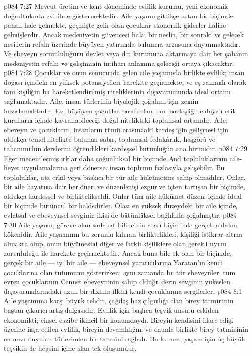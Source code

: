 \vs p084 7:27 Mevcut üretim ve kent döneminde evlilik kurumu, yeni ekonomik doğrultularda evirilme göstermektedir. Aile yaşamı gittikçe artan bir biçimde pahalı hale gelmekte, geçmişte gelir olan çocuklar ekonomik giderler haline gelmişlerdir. Ancak medeniyetin güvencesi hala; bir neslin, bir sonraki ve gelecek nesillerin refahı üzerinde büyüyen yatırımda bulunma arzusuna dayanmaktadır. Ve ebeveyn sorumluluğunu devlet veya din kurumuna aktarmaya dair her çabanın medeniyetin refahı ve gelişiminin intiharı anlamına geleceği ortaya çıkacaktır.
\vs p084 7:28 Çocuklar ve onun sonucunda gelen aile yaşamıyla birlikte evlilik; insan doğası içindeki en yüksek potansiyelleri harekete geçirmekte, ve eş zamanlı olarak fani kişiliğin bu hareketlendirilmiş niteliklerinin dışavurumunda ideal ortamı sağlamaktadır. Aile, insan türlerinin biyolojik çoğalımı için zemin hazırlamaktadır. Ev, büyüyen çocuklar tarafından kan kardeşliğine dayalı etik kuralların içinde kavranabileceği doğal nitelikteki toplumsal ortamdır. Aile; ebeveyn ve çocukların, insanların tümü arasındaki kardeşliğin gelişmesi için oldukça temel nitelikte bulunan sabır, toplumsal fedakârlık, hoşgörü ve tahammülün derslerini öğrendikleri kardeşsel bütünlüğün ana birimidir.
\vs p084 7:29 Eğer medenileşmiş ırklar daha çoğunluksal bir biçimde And topluluklarının aile\hyp{}heyet uygulamalarına geri dönerse, insan toplumu fazlasıyla gelişebilir. Bu topluluklar, ata\hyp{}erkil veya baskıcı bir tür aile hükümetine sahip olmadılar. Onlar, bir aile hayatına dair her öneri ve düzenlenişi özgür ve içten tartışan bir biçimde, oldukça kardeşsel ve birliktelikseldi. Onlar tüm aile hükümet düzeni içinde ideal bir biçimde bütüncül bir haldedirler. Olası en yüksek düzeydeki bir aile içinde, evlatsal ve ebeveynsel sevginin ikisi de bütünlüksel bağlılıkla çoğalmıştır.
\vs p084 7:30 Aile yaşamı, göreve olan sadakat bilincinin atası biçiminde gerçek ahlakın kökenidir. Aile yaşamının bu zorunlu kılınan birliktelikleri; kişiliği istikrar altına almakta olup, onun büyümesini diğer ve farklı kişiliklere olan gerekli uyum zorunluluğu ile harekete geçirmektedir. Ancak buna bile ek olan bir biçimde, gerçek bir aile --- iyi bir aile --- ebeveynsel yaratıcılarına Yaratan’ın kendi çocuklarına olan tutumunu gösterirken; aynı zamanda bu tür ebeveynler, tüm evren çocuklarının Cennet ebeveyninin sahip olduğu derin sevginin yükselen dışavurumlarındaki uzun bir dizinin ilkini kendi çocuklarına sergilerler.
\vs p084 8:1 Aile yaşamıma karşı büyük tehdit, çağdaş haz çılgınlığı olan birey tatmininin baştan çıkarıcı artış dalgasıdır. Evlilik için başlıca teşvik unsuru eskiden ekonomikti; cinsel cazibe ikincil bir konumdaydı. Bireyin kendisini idare edişi üzerine inşa edilen evlilik, bireyin devamlılığını ve onunla birlikte birey tatmininin en arzu duyulan türlerinden bir tanesini sağladı. Bu kurum, yaşam için üç büyük teşvikin de hepsini içine alan tek oluşumdur.
